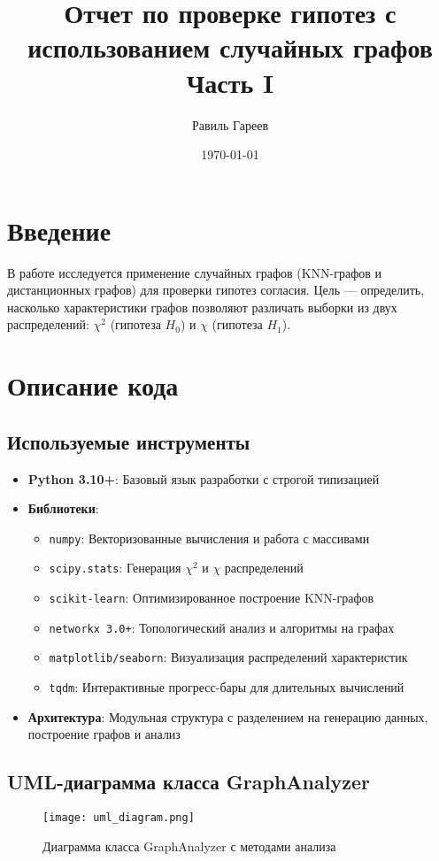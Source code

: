 \documentclass[a4paper, 12pt]{article}
\title{Отчет по проверке гипотез с использованием случайных графов \\
Часть I}
\author{Равиль Гареев}
\date{\today}
\begin{document}
\maketitle

\section*{Введение}
В работе исследуется применение случайных графов (KNN-графов и дистанционных графов) для проверки гипотез согласия. 
Цель — определить, насколько характеристики графов позволяют различать выборки из двух распределений: \(\chi^2\) (гипотеза \(H_0\)) и \(\chi\) (гипотеза \(H_1\)).

\section{Описание кода}

\subsection{Используемые инструменты}
\begin{itemize}
    \item \textbf{Python 3.10+}: Базовый язык разработки с строгой типизацией
    \item \textbf{Библиотеки}:
    \begin{itemize}
        \item \texttt{numpy}: Векторизованные вычисления и работа с массивами
        \item \texttt{scipy.stats}: Генерация $\chi^2$ и $\chi$ распределений
        \item \texttt{scikit-learn}: Оптимизированное построение KNN-графов
        \item \texttt{networkx 3.0+}: Топологический анализ и алгоритмы на графах
        \item \texttt{matplotlib/seaborn}: Визуализация распределений характеристик
        \item \texttt{tqdm}: Интерактивные прогресс-бары для длительных вычислений
    \end{itemize}
    \item \textbf{Архитектура}: Модульная структура с разделением на генерацию данных, построение графов и анализ
\end{itemize}

\subsection{UML-диаграмма класса GraphAnalyzer}
\begin{figure}[H]
    \centering
    \texttt{[image: uml\_diagram.png]}
    \caption{Диаграмма класса GraphAnalyzer с методами анализа}
    \label{fig:uml_graph}
\end{figure}
\end{document}

